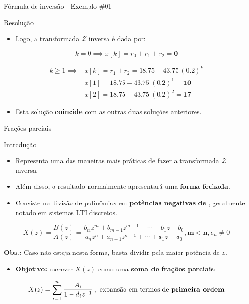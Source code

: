 \begin{frame}{Fórmula de inversão - Exemplo \#01}
\begin{block}{Resolução}
\begin{itemize}
    \item Logo, a transformada $\mathcal{Z}$ inversa é dada por:
\end{itemize}

$$k = 0 \implies x[k] = r_0 + r_1 + r_2 = \bm{0}$$

\begin{align*}
k \geq 1 \implies & x[k] = r_1 + r_2 = \num{18.75} -\num{43.75} \ (\num{0.2})^k \\
& x[1] = \num{18.75} -\num{43.75} \ (\num{0.2})^1 = \bm{10} \\
& x[2] = \num{18.75} -\num{43.75} \ (\num{0.2})^2 = \bm{17}
\end{align*}
\begin{itemize}
    \item Esta solução \textbf{coincide} com as outras duas soluções anteriores.
\end{itemize}
\end{block}
\end{frame}

\begin{frame}{Frações parciais}
\begin{block}{Introdução}
\begin{itemize}
    \item Representa uma das maneiras mais práticas de fazer a transformada $\mathcal{Z}$ inversa. 
    \item Além disso, o resultado  normalmente apresentará uma \textbf{forma fechada}.
	\item Consiste na divisão de polinômios em \textbf{potências negativas de} , geralmente notado em sistemas LTI discretos.
\end{itemize}
	
$$X(z) = \dfrac{B(z)}{A(z)} = \dfrac{b_{m}z^{m}+b_{m-1}z^{m-1}+\cdots+b_{1}z+b_{0}}{a_{n}z^{n}+a_{n-1}z^{n-1}+\cdots+a_{1}z+a_{0}}, \bm{m < n}, a_n \neq 0$$
	
\textbf{Obs.:} Caso não esteja nesta forma, basta dividir pela maior potência de $ z $.

\begin{itemize}
    \item \textbf{Objetivo:} escrever $ X(z) $ como uma \textbf{soma de frações parciais}:
\end{itemize}
	\[ X(z)=\sum_{i=1}^{n}\dfrac{A_i}{1-d_iz^{-1}} \, , \text{ expansão em termos de \textbf{primeira ordem}} \]
\end{block}
\end{frame}

